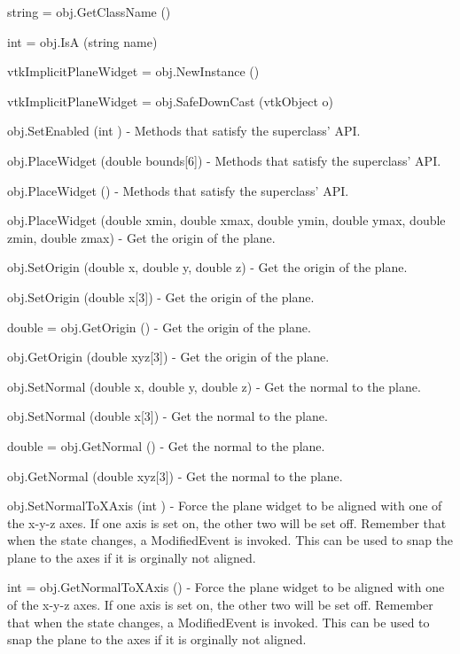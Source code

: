 \begin{DoxyItemize}
\item {\ttfamily string = obj.\-Get\-Class\-Name ()}  
\item {\ttfamily int = obj.\-Is\-A (string name)}  
\item {\ttfamily vtk\-Implicit\-Plane\-Widget = obj.\-New\-Instance ()}  
\item {\ttfamily vtk\-Implicit\-Plane\-Widget = obj.\-Safe\-Down\-Cast (vtk\-Object o)}  
\item {\ttfamily obj.\-Set\-Enabled (int )} -\/ Methods that satisfy the superclass' A\-P\-I.  
\item {\ttfamily obj.\-Place\-Widget (double bounds\mbox{[}6\mbox{]})} -\/ Methods that satisfy the superclass' A\-P\-I.  
\item {\ttfamily obj.\-Place\-Widget ()} -\/ Methods that satisfy the superclass' A\-P\-I.  
\item {\ttfamily obj.\-Place\-Widget (double xmin, double xmax, double ymin, double ymax, double zmin, double zmax)} -\/ Get the origin of the plane.  
\item {\ttfamily obj.\-Set\-Origin (double x, double y, double z)} -\/ Get the origin of the plane.  
\item {\ttfamily obj.\-Set\-Origin (double x\mbox{[}3\mbox{]})} -\/ Get the origin of the plane.  
\item {\ttfamily double = obj.\-Get\-Origin ()} -\/ Get the origin of the plane.  
\item {\ttfamily obj.\-Get\-Origin (double xyz\mbox{[}3\mbox{]})} -\/ Get the origin of the plane.  
\item {\ttfamily obj.\-Set\-Normal (double x, double y, double z)} -\/ Get the normal to the plane.  
\item {\ttfamily obj.\-Set\-Normal (double x\mbox{[}3\mbox{]})} -\/ Get the normal to the plane.  
\item {\ttfamily double = obj.\-Get\-Normal ()} -\/ Get the normal to the plane.  
\item {\ttfamily obj.\-Get\-Normal (double xyz\mbox{[}3\mbox{]})} -\/ Get the normal to the plane.  
\item {\ttfamily obj.\-Set\-Normal\-To\-X\-Axis (int )} -\/ Force the plane widget to be aligned with one of the x-\/y-\/z axes. If one axis is set on, the other two will be set off. Remember that when the state changes, a Modified\-Event is invoked. This can be used to snap the plane to the axes if it is orginally not aligned.  
\item {\ttfamily int = obj.\-Get\-Normal\-To\-X\-Axis ()} -\/ Force the plane widget to be aligned with one of the x-\/y-\/z axes. If one axis is set on, the other two will be set off. Remember that when the state changes, a Modified\-Event is invoked. This can be used to snap the plane to the axes if it is orginally not aligned.  

\end{DoxyItemize}
